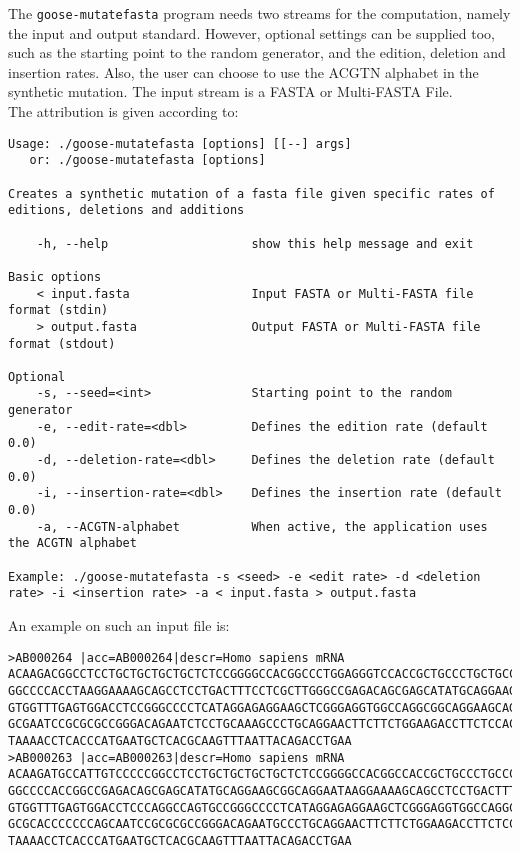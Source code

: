 The \texttt{goose-mutatefasta} program needs two streams for the computation, namely the input and output standard. However, optional settings can be supplied too, such as the starting point to the random generator, and the edition, deletion and insertion rates. Also, the user can choose to use the ACGTN alphabet in the synthetic mutation. The input stream is a FASTA or Multi-FASTA File.\\
The attribution is given according to:
\begin{lstlisting}
Usage: ./goose-mutatefasta [options] [[--] args]
   or: ./goose-mutatefasta [options]

Creates a synthetic mutation of a fasta file given specific rates of editions, deletions and additions

    -h, --help                    show this help message and exit

Basic options
    < input.fasta                 Input FASTA or Multi-FASTA file format (stdin)
    > output.fasta                Output FASTA or Multi-FASTA file format (stdout)

Optional
    -s, --seed=<int>              Starting point to the random generator
    -e, --edit-rate=<dbl>         Defines the edition rate (default 0.0)
    -d, --deletion-rate=<dbl>     Defines the deletion rate (default 0.0)
    -i, --insertion-rate=<dbl>    Defines the insertion rate (default 0.0)
    -a, --ACGTN-alphabet          When active, the application uses the ACGTN alphabet

Example: ./goose-mutatefasta -s <seed> -e <edit rate> -d <deletion rate> -i <insertion rate> -a < input.fasta > output.fasta
\end{lstlisting}
An example on such an input file is:
\begin{lstlisting}
>AB000264 |acc=AB000264|descr=Homo sapiens mRNA 
ACAAGACGGCCTCCTGCTGCTGCTGCTCTCCGGGGCCACGGCCCTGGAGGGTCCACCGCTGCCCTGCTGCCATTGTCCCC
GGCCCCACCTAAGGAAAAGCAGCCTCCTGACTTTCCTCGCTTGGGCCGAGACAGCGAGCATATGCAGGAAGCGGCAGGAA
GTGGTTTGAGTGGACCTCCGGGCCCCTCATAGGAGAGGAAGCTCGGGAGGTGGCCAGGCGGCAGGAAGCAGGCCAGTGCC
GCGAATCCGCGCGCCGGGACAGAATCTCCTGCAAAGCCCTGCAGGAACTTCTTCTGGAAGACCTTCTCCACCCCCCCAGC
TAAAACCTCACCCATGAATGCTCACGCAAGTTTAATTACAGACCTGAA
>AB000263 |acc=AB000263|descr=Homo sapiens mRNA 
ACAAGATGCCATTGTCCCCCGGCCTCCTGCTGCTGCTGCTCTCCGGGGCCACGGCCACCGCTGCCCTGCCCCTGGAGGGT
GGCCCCACCGGCCGAGACAGCGAGCATATGCAGGAAGCGGCAGGAATAAGGAAAAGCAGCCTCCTGACTTTCCTCGCTTG
GTGGTTTGAGTGGACCTCCCAGGCCAGTGCCGGGCCCCTCATAGGAGAGGAAGCTCGGGAGGTGGCCAGGCGGCAGGAAG
GCGCACCCCCCCAGCAATCCGCGCGCCGGGACAGAATGCCCTGCAGGAACTTCTTCTGGAAGACCTTCTCCTCCTGCAAA
TAAAACCTCACCCATGAATGCTCACGCAAGTTTAATTACAGACCTGAA
\end{lstlisting}

